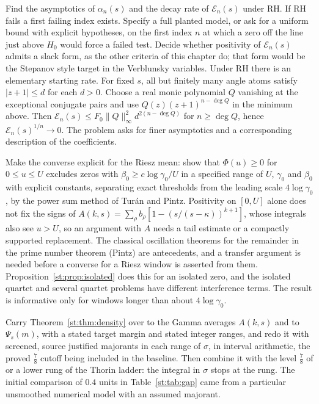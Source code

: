 \begin{problem}\label{st:op:inv}
Find the asymptotics of $\alpha_n(s)$ and the decay rate of $\mathcal E_n(s)$ under RH. If RH fails a first failing index exists. Specify a full planted model, or ask for a uniform bound with explicit hypotheses, on the first index $n$ at which a zero off the line just above $H_0$ would force a failed test. Decide whether positivity of $\mathcal E_n(s)$ admits a slack form, as the other criteria of this chapter do; that form would be the Stepanov style target in the Verblunsky variables. Under RH there is an elementary starting rate. For fixed $s$, all but finitely many angle atoms satisfy $|z+1|\le d$ for each $d>0$. Choose a real monic polynomial $Q$ vanishing at the exceptional conjugate pairs and use $Q(z)(z+1)^{n-\deg Q}$ in the minimum above. Then $\mathcal E_n(s)\le F_0\|Q\|_\infty^2d^{2(n-\deg Q)}$ for $n\ge\deg Q$, hence $\mathcal E_n(s)^{1/n}\to0$. The problem asks for finer asymptotics and a corresponding description of the coefficients.
\end{problem}
\begin{problem}\label{st:op:pintz}
Make the converse explicit for the Riesz mean: show that $\Phi(u)\ge0$ for $0\le u\le U$ excludes zeros with $\beta_0\ge c\log\gamma_0/U$ in a specified range of $U$, $\gamma_0$ and $\beta_0$ with explicit constants, separating exact thresholds from the leading scale $4\log\gamma_0$, by the power sum method of Tur\'an and Pintz. Positivity on $[0,U]$ alone does not fix the signs of $A(k,s)=\sum_\rho b_\rho[1-(s/(s-\kappa))^{k+1}]$, whose integrals also see $u>U$, so an argument with $A$ needs a tail estimate or a compactly supported replacement. The classical oscillation theorems for the remainder in the prime number theorem (Pintz) are antecedents, and a transfer argument is needed before a converse for a Riesz window is asserted from them. Proposition~\ref{st:prop:isolated} does this for an isolated zero, and the isolated quartet and several quartet problems have different interference terms. The result is informative only for windows longer than about $4\log\gamma_0$.
\end{problem}
\begin{problem}\label{st:op:dens}
Carry Theorem~\ref{st:thm:density} over to the Gamma averages $A(k,s)$ and to $\Psi_s(m)$, with a stated target margin and stated integer ranges, and redo it with screened, source justified majorants in each range of $\sigma$, in interval arithmetic, the proved $\tfrac78$ cutoff being included in the baseline. Then combine it with the level $\tfrac78$ of \cite{OAI26a} or a lower rung of the Thorin ladder: the integral in $\sigma$ stops at the rung. The initial comparison of $0.4$ units in Table~\ref{st:tab:gap} came from a particular unsmoothed numerical model with an assumed majorant.
\end{problem}
